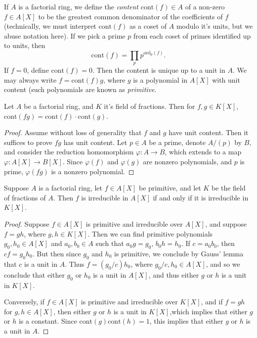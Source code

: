 %
If $A$ is a factorial ring, we define the \emph{content} $\text{cont}(f) \in A$ of a non-zero $f \in A[X]$ to be the greatest common denominator of the coefficients of $f$ (technically, we must interpret $\text{cont}(f)$ as a coset of $A$ modulo it's units, but we abuse notation here). If we pick a prime $p$ from each coset of primes identified up to units, then 
%
\[ \text{cont}(f) = \prod_p p^{\text{ord}_p(f)}. \]
%
If $f = 0$, define $\text{cont}(f) = 0$. Then the content is unique up to a unit in $A$. We may always write $f = \text{cont}(f)g$, where $g$ is a polynomial in $A[X]$ with unit content (such polynomials are known as \emph{primitive}.

\begin{lemma}[Gauss]
    Let $A$ be a factorial ring, and $K$ it's field of fractions. Then for $f,g \in K[X]$, $\text{cont}(fg) = \text{cont}(f) \cdot \text{cont}(g)$.
\end{lemma}
\begin{proof}
    Assume without loss of generality that $f$ and $g$ have unit content. Then it suffices to prove $fg$ has unit content. Let $p \in A$ be a prime, denote $A/(p)$ by $B$, and consider the reduction homomorphism $\varphi: A \to B$, which extends to a map $\varphi: A[X] \to B[X]$. Since $\varphi(f)$ and $\varphi(g)$ are nonzero polynomials, and $p$ is prime, $\varphi(fg)$ is a nonzero polynomial.
\end{proof}

\begin{corollary}
    Suppose $A$ is a factorial ring, let $f \in A[X]$ be primitive, and let $K$ be the field of fractions of $A$. Then $f$ is irreducible in $A[X]$ if and only if it is irreducible in $K[X]$.
\end{corollary}
\begin{proof}
    Suppose $f \in A[X]$ is primitive and irreducible over $A[X]$, and suppose $f = gh$, where $g,h \in K[X]$. Then we can find primitive polynomials $g_0,h_0 \in A[X]$ and $a_0,b_0 \in A$ such that $a_0g = g_0$, $b_0h = h_0$. If $c = a_0b_0$, then $cf = g_0h_0$. But then since $g_0$ and $h_0$ is primitive, we conclude by Gauss' lemma that $c$ is a unit in $A$. Thus $f = (g_0/c) h_0$, where $g_0/c, h_0 \in A[X]$, and so we conclude that either $g_0$ or $h_0$ is a unit in $A[X]$, and thus either $g$ or $h$ is a unit in $K[X]$.

    Conversely, if $f \in A[X]$ is primitive and irreducible over $K[X]$, and if $f = gh$ for $g,h \in A[X]$, then either $g$ or $h$ is a unit in $K[X]$,which implies that either $g$ or $h$ is a constant. Since $\text{cont}(g) \text{cont}(h) = 1$, this implies that either $g$ or $h$ is a unit in $A$.
\end{proof}

